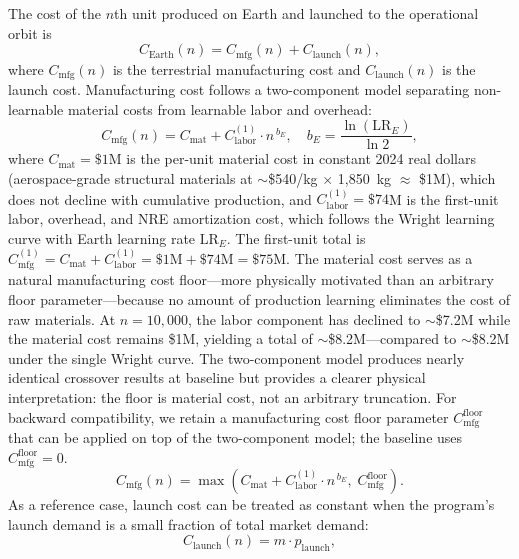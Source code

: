 \documentclass[preprint,12pt]{elsarticle}
\begin{document}
The cost of the $n$th unit produced on Earth and launched to the operational orbit is
\begin{equation}
  C_{\mathrm{Earth}}(n) = C_{\mathrm{mfg}}(n) + C_{\mathrm{launch}}(n),
  \label{eq:earth_unit}
\end{equation}
where $C_{\mathrm{mfg}}(n)$ is the terrestrial manufacturing cost and $C_{\mathrm{launch}}(n)$ is the launch cost. Manufacturing cost follows a two-component model separating non-learnable material costs from learnable labor and overhead:
\begin{equation}
  C_{\mathrm{mfg}}(n) = C_{\mathrm{mat}} + C_{\mathrm{labor}}^{(1)} \cdot n^{\,b_E}, \quad b_E = \frac{\ln(\mathrm{LR}_E)}{\ln 2},
  \label{eq:earth_mfg}
\end{equation}
where $C_{\mathrm{mat}} = \$1$M is the per-unit material cost in constant 2024 real dollars (aerospace-grade structural materials at $\sim$\$540/kg $\times$ 1{,}850~kg $\approx$ \$1M), which does not decline with cumulative production, and $C_{\mathrm{labor}}^{(1)} = \$74$M is the first-unit labor, overhead, and NRE amortization cost, which follows the Wright learning curve with Earth learning rate $\mathrm{LR}_E$. The first-unit total is $C_{\mathrm{mfg}}^{(1)} = C_{\mathrm{mat}} + C_{\mathrm{labor}}^{(1)} = \$1\text{M} + \$74\text{M} = \$75\text{M}$. The material cost serves as a natural manufacturing cost floor---more physically motivated than an arbitrary floor parameter---because no amount of production learning eliminates the cost of raw materials. At $n = 10{,}000$, the labor component has declined to $\sim$\$7.2M while the material cost remains \$1M, yielding a total of $\sim$\$8.2M---compared to $\sim$\$8.2M under the single Wright curve. The two-component model produces nearly identical crossover results at baseline but provides a clearer physical interpretation: the floor is material cost, not an arbitrary truncation. For backward compatibility, we retain a manufacturing cost floor parameter $C_{\mathrm{mfg}}^{\mathrm{floor}}$ that can be applied on top of the two-component model; the baseline uses $C_{\mathrm{mfg}}^{\mathrm{floor}} = 0$.
\begin{equation}
  C_{\mathrm{mfg}}(n) = \max\!\left(C_{\mathrm{mat}} + C_{\mathrm{labor}}^{(1)} \cdot n^{\,b_E},\; C_{\mathrm{mfg}}^{\mathrm{floor}}\right).
  \label{eq:earth_mfg_floor}
\end{equation}
As a reference case, launch cost can be treated as constant when the program's launch demand is a small fraction of total market demand:
\begin{equation}
  C_{\mathrm{launch}}(n) = m \cdot p_{\mathrm{launch}},
  \label{eq:earth_launch_baseline}
\end{equation}
\end{document}
